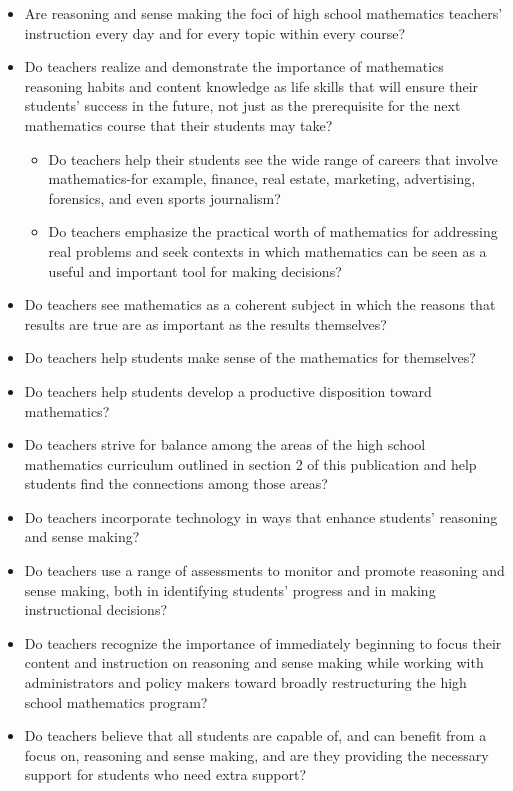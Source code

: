 \documentclass[
  10pt,
  a4paper,
  landscape,
  twoside,
  openany
]{scrbook}
\newcommand{\EN}[1]{#1}
\newcounter{example}
\begin{document}
\TriPara
{
\EN{
  \begin{itemize}
    \item Are reasoning and sense making the foci of high school mathematics teachers' instruction every day and for every topic within every course?
    \item Do teachers realize and demonstrate the importance of mathematics reasoning habits and content knowledge as life skills that will ensure their students' success in the future, not just as the prerequisite for the next mathematics course that their students may take?
      \begin{itemize}
        \item Do teachers help their students see the wide range of careers that involve mathematics-for example, finance, real estate, marketing, advertising, forensics, and even sports journalism?
        \item Do teachers emphasize the practical worth of mathematics for addressing real problems and seek contexts in which mathematics can be seen as a useful and important tool for making decisions?
      \end{itemize}
    \item Do teachers see mathematics as a coherent subject in which the reasons that results are true are as important as the results themselves?
    \item Do teachers help students make sense of the mathematics for themselves?
    \item Do teachers help students develop a productive disposition toward mathematics?
    \item Do teachers strive for balance among the areas of the high school mathematics curriculum outlined in section 2 of this publication and help students find the connections among those areas?
    \item Do teachers incorporate technology in ways that enhance students' reasoning and sense making?
    \item Do teachers use a range of assessments to monitor and promote reasoning and sense making, both in identifying students' progress and in making instructional decisions?
    \item Do teachers recognize the importance of immediately beginning to focus their content and instruction on reasoning and sense making while working with administrators and policy makers toward broadly restructuring the high school mathematics program?
    \item Do teachers believe that all students are capable of, and can benefit from a focus on, reasoning and sense making, and are they providing the necessary support for students who need extra support?

\end{itemize}}}
\end{document}

